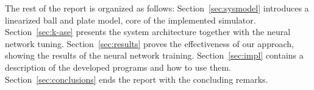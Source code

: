 
The rest of the report is organized as follows: Section~\ref{sec:sysmodel}
introduces a linearized ball and plate model, core of the implemented simulator.
Section~\ref{sec:k-ase} presents the system architecture together with the
neural network tuning.
Section~\ref{sec:results} proves the effectiveness of our approach, showing
the results of the neural network training. Section~\ref{sec:impl}
contains a description of the developed programs and how to use them. 
Section~\ref{sec:conclusions} ends the report with the concluding remarks.



